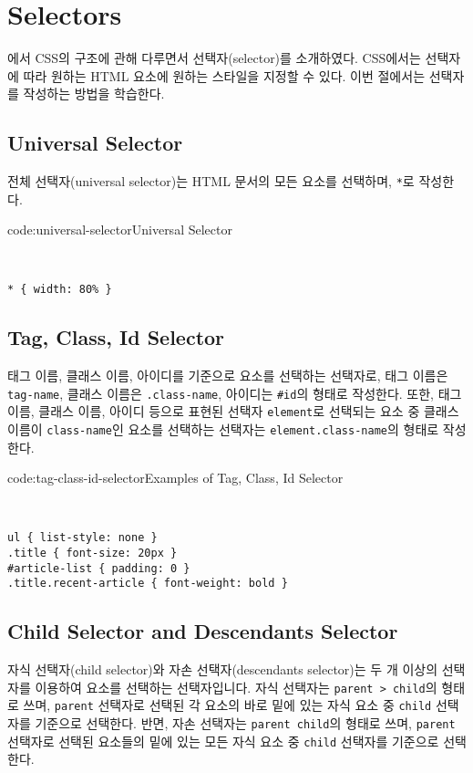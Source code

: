 \section{Selectors} \label{sect:selectors}

에서 CSS의 구조에 관해 다루면서 선택자(selector)를 소개하였다. CSS에서는 선택자에 따라 원하는 HTML 요소에 원하는 스타일을 지정할 수 있다. 이번 절에서는 선택자를 작성하는 방법을 학습한다.

\subsection*{Universal Selector}

전체 선택자(universal selector)는 HTML 문서의 모든 요소를 선택하며, \texttt{*}로 작성한다.

\begin{codeenv}{code:universal-selector}{Universal Selector}\begin{verbatim}


* { width: 80% }
\end{verbatim}
\end{codeenv}

\subsection*{Tag, Class, Id Selector}
태그 이름, 클래스 이름, 아이디를 기준으로 요소를 선택하는 선택자로, 태그 이름은 \texttt{tag-name}, 클래스 이름은 \texttt{.class-name}, 아이디는 \texttt{\#id}의 형태로 작성한다. 또한, 태그 이름, 클래스 이름, 아이디 등으로 표현된 선택자 \texttt{element}로 선택되는 요소 중 클래스 이름이 \texttt{class-name}인 요소를 선택하는 선택자는 \texttt{element.class-name}의 형태로 작성한다.

\begin{codeenv}{code:tag-class-id-selector}{Examples of Tag, Class, Id Selector}\begin{verbatim}


ul { list-style: none }
.title { font-size: 20px }
#article-list { padding: 0 }
.title.recent-article { font-weight: bold }
\end{verbatim}
\end{codeenv}

\subsection*{Child Selector and Descendants Selector}
자식 선택자(child selector)와 자손 선택자(descendants selector)는 두 개 이상의 선택자를 이용하여 요소를 선택하는 선택자입니다. 자식 선택자는 \texttt{parent > child}의 형태로 쓰며, \texttt{parent} 선택자로 선택된 각 요소의 바로 밑에 있는 자식 요소 중 \texttt{child} 선택자를 기준으로 선택한다. 반면, 자손 선택자는 \texttt{parent child}의 형태로 쓰며, \texttt{parent} 선택자로 선택된 요소들의 밑에 있는 모든 자식 요소 중 \texttt{child} 선택자를 기준으로 선택한다.

